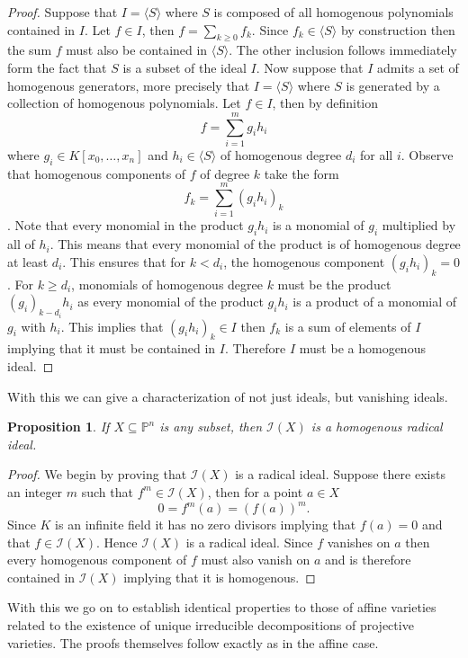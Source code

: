 \documentclass[40pt]{article}
\newcommand{\Proj}{\mathbb{P}}
\newcommand{\I}{\mathcal{I}}
\newcommand{\la}{\langle}
\newcommand{\ra}{\rangle}
\newtheorem{proposition}{Proposition}[section]
\theoremstyle{remark}
\begin{document}
\begin{proof}
	Suppose that $I = \la S \ra$ where $S$ is composed of all homogenous polynomials contained in $I$. Let $f \in I$, then $f = \sum_{k\geq 0}f_k$. Since $f_k \in \la S\ra$ by construction then the sum $f$ must also be contained in $\la S \ra$. The other inclusion follows immediately form the fact that $S$ is a subset of the ideal $I$. Now suppose that $I$ admits a set of homogenous generators, more precisely that $I = \la S \ra$ where $S$ is generated by a collection of homogenous polynomials. Let $f \in I$, then by definition 
	\[f = \sum_{i=1}^m g_ih_i\]
	where $g_i \in K[x_0,\dots,x_n]$ and $h_i \in \la S \ra$ of homogenous degree $d_i$ for all $i$. Observe that homogenous components of $f$ of degree $k$ take the form 
	\[f_k = \sum_{i=1}^m (g_ih_i)_k\]. 
	Note that every monomial in the product $g_ih_i$ is a monomial of $g_i$ multiplied by all of $h_i$. This means that every monomial of the product is of homogenous degree at least $d_i$. This ensures that for $k < d_i$, the homogenous component $(g_ih_i)_k = 0$. For $k \geq d_i$, monomials of homogenous degree $k$ must be the product $(g_i)_{k - d_i}h_i$ as every monomial of the product $g_ih_i$ is a product of a monomial of $g_i$ with $h_i$. This implies that $(g_ih_i)_k \in I$ then $f_k$ is a sum of elements of $I$ implying that it must be contained in $I$. Therefore $I$ must be a homogenous ideal. 
\end{proof}
With this we can give a characterization of not just ideals, but vanishing ideals.
\begin{proposition}
	If $X \subseteq \Proj^n$ is any subset, then $\I(X)$ is a homogenous radical ideal. 
\end{proposition}
\begin{proof}
	We begin by proving that $\I(X)$ is a radical ideal. Suppose there exists an integer $m$ such that $f^m \in \I(X)$, then for a point $a \in X$ 
	\[
	0 = f^m(a) = (f(a))^m.
	\]
	Since $K$ is an infinite field it has no zero divisors implying that $f(a) = 0$ and that $f \in \I(X)$. Hence $\I(X)$ is a radical ideal. Since $f$ vanishes on $a$ then every homogenous component of $f$ must also vanish on $a$ and is therefore contained in $\I(X)$ implying that it is homogenous. 
\end{proof}
With this we go on to establish identical properties to those of affine varieties related to the existence of unique irreducible decompositions of projective varieties. The proofs themselves follow exactly as in the affine case. 
\end{document}
